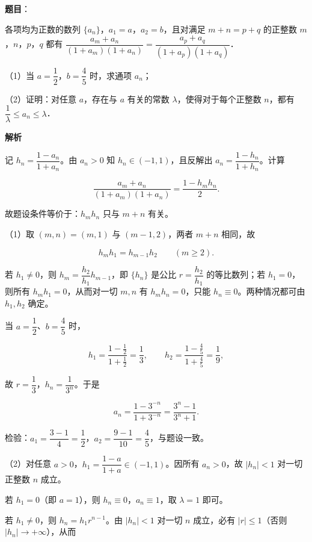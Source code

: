 \begin{answer}

\textbf{题目}：

各项均为正数的数列 $\{a_n\}$，$a_1=a$，$a_2=b$，且对满足 $m+n=p+q$ 的正整数 $m$，$n$，$p$，$q$ 都有 $\dfrac{a_m+a_n}{(1+a_m)(1+a_n)}=\dfrac{a_p+a_q}{(1+a_p)(1+a_q)}$．

（1）当 $a=\dfrac12$，$b=\dfrac45$ 时，求通项 $a_n$；

（2）证明：对任意 $a$，存在与 $a$ 有关的常数 $\lambda$，使得对于每个正整数 $n$，都有 $\dfrac1\lambda\leqslant a_n\leqslant\lambda$．

\textbf{解析}

记 $h_n=\dfrac{1-a_n}{1+a_n}$。由 $a_n>0$ 知 $h_n\in(-1,1)$，且反解出 $a_n=\dfrac{1-h_n}{1+h_n}$。计算

\nopagebreak[4]
\[\frac{a_m+a_n}{(1+a_m)(1+a_n)}=\frac{1-h_mh_n}{2}.\]

故题设条件等价于：$h_mh_n$ 只与 $m+n$ 有关。

（1）取 $(m,n)=(m,1)$ 与 $(m-1,2)$，两者 $m+n$ 相同，故

\nopagebreak[4]
\[h_mh_1=h_{m-1}h_2\qquad(m\geqslant2).\]

若 $h_1\neq0$，则 $h_m=\dfrac{h_2}{h_1}h_{m-1}$，即 $\{h_n\}$ 是公比 $r=\dfrac{h_2}{h_1}$ 的等比数列；若 $h_1=0$，则所有 $h_mh_1=0$，从而对一切 $m,n$ 有 $h_mh_n=0$，只能 $h_n\equiv0$。两种情况都可由 $h_1,h_2$ 确定。

当 $a=\dfrac12$、$b=\dfrac45$ 时，

\nopagebreak[4]
\[h_1=\frac{1-\frac12}{1+\frac12}=\frac13,\qquad h_2=\frac{1-\frac45}{1+\frac45}=\frac19,\]

故 $r=\dfrac13$，$h_n=\dfrac1{3^n}$。于是

\nopagebreak[4]
\[a_n=\frac{1-3^{-n}}{1+3^{-n}}=\frac{3^n-1}{3^n+1}.\]

检验：$a_1=\dfrac{3-1}{4}=\dfrac12$，$a_2=\dfrac{9-1}{10}=\dfrac45$，与题设一致。

（2）对任意 $a>0$，$h_1=\dfrac{1-a}{1+a}\in(-1,1)$。因所有 $a_n>0$，故 $|h_n|<1$ 对一切正整数 $n$ 成立。

若 $h_1=0$（即 $a=1$），则 $h_n\equiv0$，$a_n\equiv1$，取 $\lambda=1$ 即可。

若 $h_1\neq0$，则 $h_n=h_1r^{n-1}$。由 $|h_n|<1$ 对一切 $n$ 成立，必有 $|r|\leqslant1$（否则 $|h_n|\to+\infty$），从而


\end{answer}
